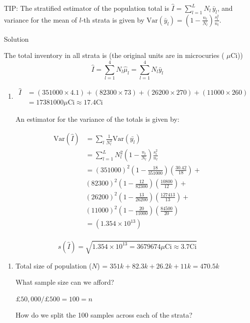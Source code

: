 \documentclass[
  letterpaper,
  DIV=11,
  numbers=noendperiod,
  oneside]{scrartcl}
\begin{document}
\begin{tcolorbox}
TIP: The stratified estimator of the population total is
\(\hat{I} = \sum_{l=1}^{L} N_l \, \bar{y}_l\), and variance for the mean
of \(l\)-th strata is given by
\(\text{Var}(\bar{y}_l)= \left( 1 - \frac{n_l}{N_l} \right)\frac{s_l^2}{n_l}\).

Solution

The total inventory in all strata is (the original units are in
microcuries ( \(\mu\)Ci))
\[\hat{I} = \sum_{l=1}^4 N_l\hat{\mu}_l = \sum_{l=1}^4 N_l\bar{y}_l\]

\begin{enumerate}
\def\labelenumi{(\alph{enumi})}
\item
  \[ \begin{aligned}
  \hat{I} &= (351000 \times 4.1) + (82300 \times 73)+ (26200 \times 270)+ (11000 \times 260)\\
  & = 17381000 \mu\text{Ci} \approx 17.4 \text{Ci}
  \end{aligned}\]

  An estimator for the variance of the totals is given by:
\end{enumerate}

\[
\begin{aligned}
\mathrm{Var}(\hat{I}) &= \sum_l\frac{1}{N_l^2}\mathrm{Var}(\bar{y_l}) \\
&= \sum_{l=1}^{L}N_l^2 \left( 1 - \frac{n_l}{N_l} \right)\frac{s_l^2}{n_l}\\
&=(351000)^2\left( 1-\frac{18}{351000}\right)\left(\frac{30.42}{18}\right) +\\
& (82300)^2\left( 1-\frac{12}{82300}\right)\left(\frac{10800}{12}\right) +\\
&(26200)^2\left( 1-\frac{13}{26200}\right)\left(\frac{127413}{13}\right)+\\
&(11000)^2\left( 1-\frac{20}{11000}\right)\left(\frac{84500}{20}\right)\\
& =(1.354 \times 10^{13})
\end{aligned}
\]\\
\[s(\hat{I}) = \sqrt{1.354 \times 10^{13} = 3679674 \mu\text{Ci} \approx 3.7\text{Ci}}\]

\begin{enumerate}
\def\labelenumi{(\alph{enumi})}
\setcounter{enumi}{1}
\item
  Total size of population (\(N\)) = \(351k+82.3k+26.2k+11k=470.5k\)

  What sample size can we afford?

  \(£50,000/£500 = 100 = n\)

  How do we split the 100 samples across each of the strata?


\end{enumerate}
\end{tcolorbox}
\end{document}
